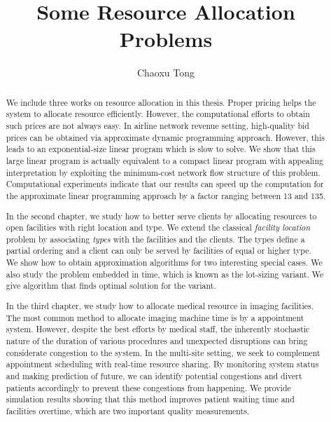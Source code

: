 \documentclass[phd,tocprelim]{cornell}
\title {Some Resource Allocation Problems}
\author {Chaoxu Tong}
\begin{document}
\maketitle
\makecopyright

\begin{abstract}
We include three works on resource allocation in this thesis. Proper pricing
helps the system to allocate resource efficiently. However, the computational
efforts to obtain such prices are not always easy. In airline network revenue
setting, high-quality bid prices can be obtained via approximate dynamic
programming approach. However, this leads to an exponential-size linear program
which is slow to solve. We show that this large linear program is actually
equivalent to a compact linear program with appealing interpretation
by exploiting the minimum-cost network flow structure of this problem.
Computational experiments indicate that our results can speed up the computation
for the approximate linear programming approach by a factor ranging between 13 and 135.

In the second chapter, we study how to better serve clients by allocating resources
to open facilities with right location and type. We extend the classical \textit{facility location}
problem by associating \textit{types} with the facilities and the clients. The types define a partial
ordering and a client can only be served by facilities of equal or higher type. We show
how to obtain approximation algorithms for two interesting special cases.
We also study the problem embedded in time, which is known as the lot-sizing variant.
We give algorithm that finds optimal solution for the variant.

In the third chapter, we study how to allocate medical resource in imaging facilities.
The most common method to allocate imaging machine time is by a appointment system.
However, despite the best efforts by medical staff, the inherently stochastic nature of the duration of various procedures and
unexpected disruptions can bring considerate congestion to the system. In the multi-site setting,
we seek to complement appointment scheduling with real-time resource sharing.
By monitoring system status and making prediction of future, we can identify
potential congestions and divert patients accordingly to prevent these congestions
from happening. We provide simulation results showing that this method improves
patient waiting time and facilities overtime, which are two important quality measurements.
\end{abstract}
\end{document}
